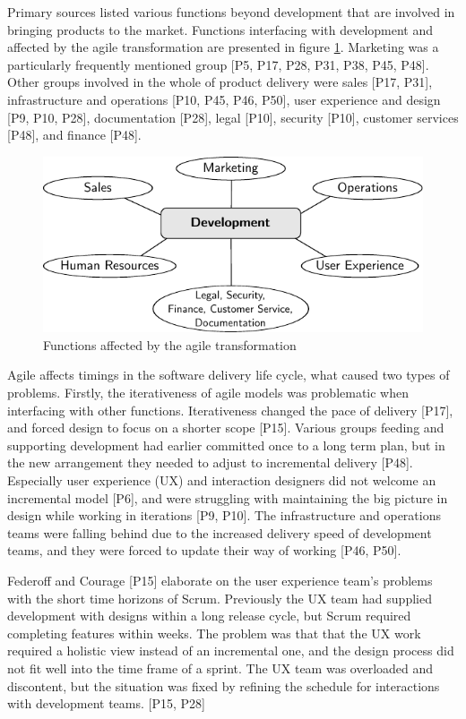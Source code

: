 Primary sources listed various functions beyond development that are involved in
bringing products to the market. Functions interfacing with development and
affected by the agile transformation are presented in figure
\ref{fig:challenges_other_functions}.
Marketing was a particularly frequently mentioned group [P5, P17, P28, P31, P38,
P45, P48]. Other groups involved in the whole of product delivery were sales
[P17, P31], infrastructure and operations [P10, P45, P46, P50], user experience
and design [P9, P10, P28], documentation [P28], legal [P10], security [P10],
customer services [P48], and finance [P48].

\begin{figure}
  \begin{center}
    \includegraphics{graphics/challenges_other_functions.pdf}
    \caption{Functions affected by the agile transformation}
    \label{fig:challenges_other_functions}
  \end{center}
\end{figure}

Agile affects timings in the software delivery life cycle, what caused two types
of problems. Firstly, the iterativeness of agile models was problematic when
interfacing with other functions. Iterativeness changed the pace of delivery
[P17], and forced design to focus on a shorter scope [P15]. Various groups
feeding and supporting development had earlier committed once to a long term
plan, but in the new arrangement they needed to adjust to incremental delivery
[P48].
Especially user experience (UX) and interaction designers did not welcome an
incremental model [P6], and were struggling with maintaining the big picture in
design while working in iterations [P9, P10].
The infrastructure and operations teams were falling behind due to the increased
delivery speed of development teams, and they were forced to update their way of
working [P46, P50].

Federoff and Courage [P15] elaborate on the user experience team's problems
with the short time horizons of Scrum. Previously the UX team had supplied
development with designs within a long release cycle, but Scrum required
completing features within weeks. The problem was that that the UX work required
a holistic view instead of an incremental one, and the design process did not
fit well into the time frame of a sprint. The UX team was overloaded and
discontent, but the situation was fixed by refining the schedule for interactions
with development teams. [P15, P28]

